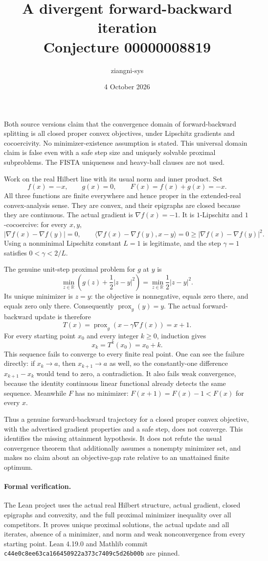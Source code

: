 \documentclass[11pt]{article}
\title{A divergent forward-backward iteration\\Conjecture 00000008819}
\author{ziangni-sys}
\date{4 October 2026}
\begin{document}
\maketitle
Both source versions claim that the convergence domain of forward-backward splitting is all closed proper convex objectives, under Lipschitz gradients and cocoercivity. No minimizer-existence assumption is stated. This universal domain claim is false even with a safe step size and uniquely solvable proximal subproblems. The FISTA uniqueness and heavy-ball clauses are not used.

Work on the real Hilbert line with its usual norm and inner product. Set
\[
f(x)=-x,\qquad g(x)=0,\qquad F(x)=f(x)+g(x)=-x.
\]
All three functions are finite everywhere and hence proper in the extended-real convex-analysis sense. They are convex, and their epigraphs are closed because they are continuous. The actual gradient is $\nabla f(x)=-1$. It is $1$-Lipschitz and $1$-cocoercive: for every $x,y$,
\[
|\nabla f(x)-\nabla f(y)|=0,\qquad
\langle\nabla f(x)-\nabla f(y),x-y\rangle
=0\ge |\nabla f(x)-\nabla f(y)|^2.
\]
Using a nonminimal Lipschitz constant $L=1$ is legitimate, and the step $\gamma=1$ satisfies $0<\gamma<2/L$.

The genuine unit-step proximal problem for $g$ at $y$ is
\[
\min_{z\in\mathbb R}\left(g(z)+\frac12|z-y|^2\right)
=\min_{z\in\mathbb R}\frac12|z-y|^2.
\]
Its unique minimizer is $z=y$: the objective is nonnegative, equals zero there, and equals zero only there. Consequently $\operatorname{prox}_g(y)=y$. The actual forward-backward update is therefore
\[
T(x)=\operatorname{prox}_g(x-\gamma\nabla f(x))=x+1.
\]
For every starting point $x_0$ and every integer $k\ge0$, induction gives
\[
x_k=T^k(x_0)=x_0+k.
\]
This sequence fails to converge to every finite real point. One can see the failure directly: if $x_k\to a$, then $x_{k+1}\to a$ as well, so the constantly-one difference $x_{k+1}-x_k$ would tend to zero, a contradiction. It also fails weak convergence, because the identity continuous linear functional already detects the same sequence. Meanwhile $F$ has no minimizer: $F(x+1)=F(x)-1<F(x)$ for every $x$.

Thus a genuine forward-backward trajectory for a closed proper convex objective, with the advertised gradient properties and a safe step, does not converge. This identifies the missing attainment hypothesis. It does not refute the usual convergence theorem that additionally assumes a nonempty minimizer set, and makes no claim about an objective-gap rate relative to an unattained finite optimum.

\paragraph{Formal verification.}
The Lean project uses the actual real Hilbert structure, actual gradient, closed epigraphs and convexity, and the full proximal minimizer inequality over all competitors. It proves unique proximal solutions, the actual update and all iterates, absence of a minimizer, and norm and weak nonconvergence from every starting point. Lean 4.19.0 and Mathlib commit \texttt{c44e0c8ee63ca166450922a373c7409c5d26b00b} are pinned.
\end{document}
